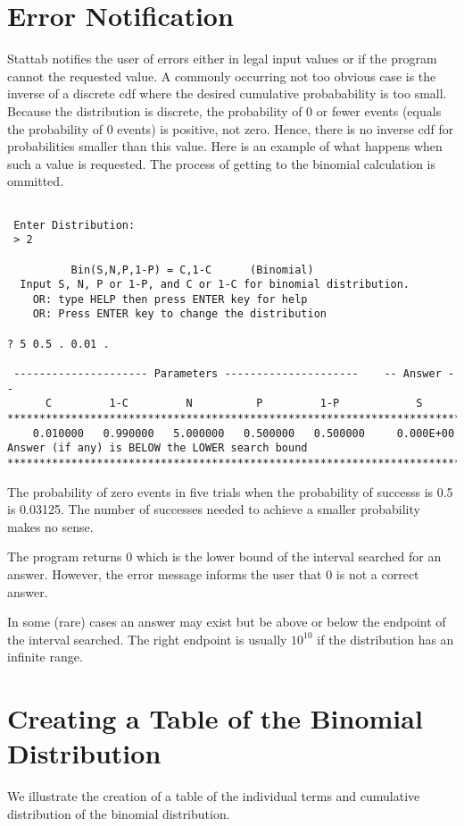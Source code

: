\documentclass[12pt,dvips]{article}
\newcommand{\mysection}[1]
    {\color{blue} \section{#1} \color{black}}
\begin{document}
\mysection{Error Notification}

Stattab notifies the user of errors either in legal input values or if
the program cannot the requested  value.  A commonly occurring not too
obvious  case is  the  inverse of  a  discrete cdf  where the  desired
cumulative probabability  is too  small.  Because the  distribution is
discrete, the probability of 0 or fewer events (equals the probability
of 0  events) is positive, not  zero.  Hence, there is  no inverse cdf
for probabilities smaller than this value.  Here is an example of what
happens when such a value is requested.  The process of getting to the
binomial calculation is ommitted.

\begin{verbatim}

 Enter Distribution: 
 > 2
 
          Bin(S,N,P,1-P) = C,1-C      (Binomial)                               
  Input S, N, P or 1-P, and C or 1-C for binomial distribution.                
    OR: type HELP then press ENTER key for help
    OR: Press ENTER key to change the distribution
 
? 5 0.5 . 0.01 .
 
 --------------------- Parameters ---------------------    -- Answer --        
      C         1-C         N          P         1-P            S              
************************************************************************
    0.010000   0.990000   5.000000   0.500000   0.500000     0.000E+00          
Answer (if any) is BELOW the LOWER search bound
************************************************************************

\end{verbatim}

The probability of zero events  in five trials when the probability of
successs is 0.5 is 0.03125.  The number of successes needed to achieve
a smaller probability makes no sense.

The  program  returns 0  which  is the  lower  bound  of the  interval
searched for an  answer.  However, the error message  informs the user
that 0 is not a correct answer.

In some  (rare) cases an  answer may exist  but be above or  below the
endpoint  of the  interval searched.   The right  endpoint  is usually
$10^{10}$ if the distribution has an infinite range.

\mysection{Creating a Table of the Binomial Distribution}

We  illustrate the creation  of a  table of  the individual  terms and
cumulative distribution of the binomial distribution.
\end{document}
